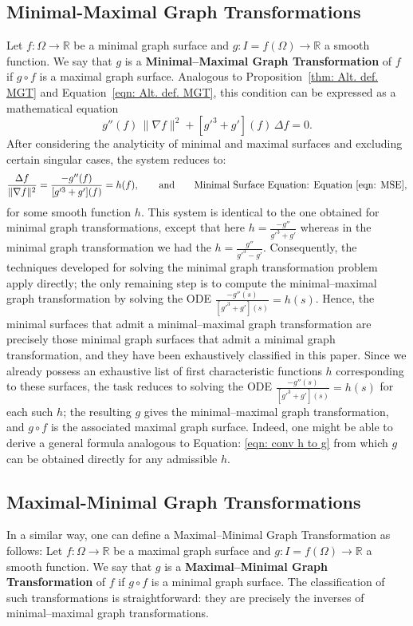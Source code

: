 \documentclass[12pt]{article}
\theoremstyle{plain}
\theoremstyle{definition}
\theoremstyle{remark}
\begin{document}
  \subsection{Minimal-Maximal Graph Transformations}
  Let \(f:\Omega\longrightarrow\mathbb{R}\) be a minimal graph surface and \(g:I=f(\Omega)\longrightarrow\mathbb{R}\) a smooth function. We say that \(g\) is a \textbf{Minimal–Maximal Graph Transformation} of \(f\) if \(g\circ f\) is a maximal graph surface. Analogous to Proposition~\ref{thm: Alt. def. MGT} and Equation~\ref{eqn: Alt. def. MGT}, this condition can be expressed as a mathematical equation
  \[
  g''(f)\,\|\nabla f\|^2+[g'^{3}+g'](f)\,\Delta f=0 .
  \]
  After considering the analyticity of minimal and maximal surfaces and excluding certain singular cases, the system reduces to:
  \[
  \frac{\Delta f}{\|\nabla f\|^2}=\frac{-g''(f)}{[g'^{3}+g'](f)}=h(f), \qquad\text{and}\qquad \text{Minimal Surface Equation: }\text{Equation }\ref{eqn: MSE},
  \]
  for some smooth function \(h\). This system is identical to the one obtained for minimal graph transformations, except that here \(h=\frac{-g''}{g'^{3}+g'}\) whereas in the minimal graph transformation we had the \(h=\frac{g''}{g'^{3}-g'}\). Consequently, the techniques developed for solving the minimal graph transformation problem apply directly; the only remaining step is to compute the minimal–maximal graph transformation by solving the ODE \(\frac{-g''(s)}{[g'^{3}+g'](s)}=h(s)\). Hence, the minimal surfaces that admit a minimal–maximal graph transformation are precisely those minimal graph surfaces that admit a minimal graph transformation, and they have been exhaustively classified in this paper. Since we already possess an exhaustive list of first characteristic functions \(h\) corresponding to these surfaces, the task reduces to solving the ODE \(\frac{-g''(s)}{[g'^{3}+g'](s)}=h(s)\) for each such \(h\); the resulting \(g\) gives the minimal–maximal graph transformation, and \(g\circ f\) is the associated maximal graph surface. Indeed, one might be able to derive a general formula analogous to Equation: \ref{eqn: conv h to g} from which \(g\) can be obtained directly for any admissible \(h\).
  
  \subsection{Maximal-Minimal Graph Transformations}
  In a similar way, one can define a Maximal–Minimal Graph Transformation as follows: Let \(f:\Omega\longrightarrow\mathbb{R}\) be a maximal graph surface and \(g:I=f(\Omega)\longrightarrow\mathbb{R}\) a smooth function. We say that \(g\) is a \textbf{Maximal–Minimal Graph Transformation} of \(f\) if \(g\circ f\) is a minimal graph surface. The classification of such transformations is straightforward: they are precisely the inverses of minimal–maximal graph transformations. 
  
\end{document}

